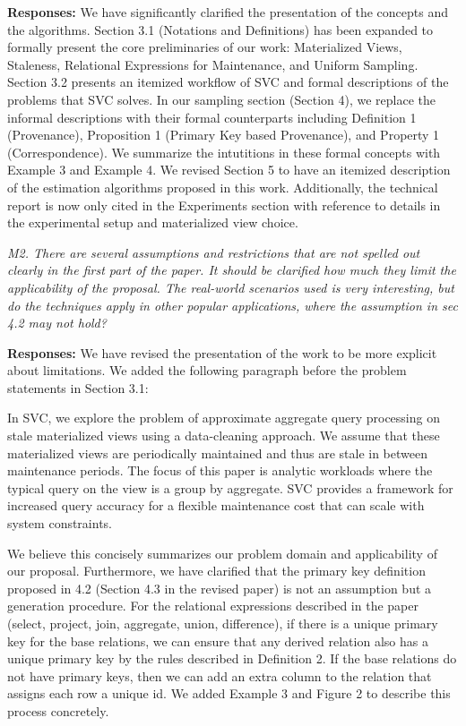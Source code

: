 {\bf Responses:} We have significantly clarified the presentation of the concepts and the algorithms. Section 3.1 (Notations and Definitions) has been expanded to formally present the core preliminaries of our work: Materialized Views, Staleness, Relational Expressions for Maintenance, and Uniform Sampling. Section 3.2 presents an itemized workflow of SVC and formal descriptions of the problems that SVC solves. In our sampling section (Section 4), we replace the informal descriptions with their formal counterparts including Definition 1 (Provenance), Proposition 1 (Primary Key based Provenance), and Property 1 (Correspondence). We summarize the intutitions in these formal concepts with Example 3 and Example 4. We revised Section 5 to have an itemized description of the estimation algorithms proposed in this work.  Additionally, the technical report is now only cited in the Experiments section with reference to details in the experimental setup and materialized view choice.

\vspace{1em}
\emph{M2. There are several assumptions and restrictions that are not spelled out clearly in the first part of the paper. It should be clarified how much they limit the applicability of the proposal. The real-world scenarios used is very interesting, but do the techniques apply in other popular applications, where the assumption in sec 4.2 may not hold?}

\vspace{.25em}

{\bf Responses:} We have revised the presentation of the work to be more explicit about limitations. We added the following paragraph before the problem statements in Section 3.1:
\begin{displayquote}In SVC, we explore the problem of approximate aggregate query
processing on stale materialized views using a data-cleaning approach.
We assume that these materialized views are periodically
maintained and thus are stale in between maintenance periods. The
focus of this paper is analytic workloads where the typical query on the view is a group by aggregate. SVC provides a framework for increased
query accuracy for a flexible maintenance cost that can
scale with system constraints.\end{displayquote}

We believe this concisely summarizes our problem domain and applicability of our proposal. 
Furthermore, we have clarified that the primary key definition proposed in 4.2 
(Section 4.3 in the revised paper) is not an assumption but a generation procedure. For the relational expressions described in the paper (select, project, join, aggregate, union, difference), if there is a unique primary key for the base relations, we can ensure that any derived relation also has a unique primary key by the rules described in Definition 2. If the base relations do not have primary keys, then we can add an extra column to the relation that assigns each row a unique id. We added Example 3 and Figure 2 to describe this process concretely.

